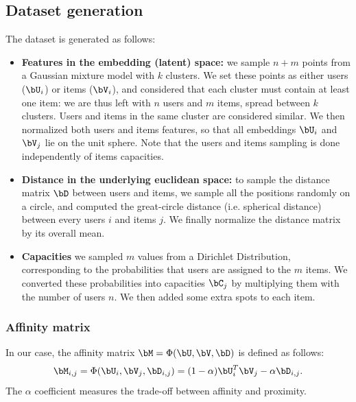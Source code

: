 \subsection*{Dataset generation}
The dataset is generated as follows:
\begin{itemize}
    \item \textbf{Features in the embedding (latent) space:} we sample $n+m$
          points from a Gaussian mixture model with $k$ clusters. We set these points
          as either users ($\bU_i$) or items ($\bV_i$), and considered that each
          cluster must contain at least one item: we are thus left with $n$ users and
          $m$ items, spread between $k$ clusters. Users and items in the same cluster
          are considered similar. We then normalized both users and items features, so
          that all embeddings $\bU_i$ and $\bV_j$ lie on the unit sphere. Note that
          the users and items sampling is done independently of items capacities.

    \item \textbf{Distance in the underlying euclidean space:} to sample the
          distance matrix $\bD$ between users and items, we sample all the positions
          randomly on a circle, and computed the great-circle distance (i.e. spherical
          distance) between every users $i$ and items $j$. We finally normalize the
          distance matrix by its overall mean.

    \item \textbf{Capacities} we sampled $m$ values from a Dirichlet
          Distribution, corresponding to the probabilities that users are assigned to
          the $m$ items. We converted these probabilities into capacities $\bC_j$ by
          multiplying them with the number of users $n$. We then added some extra
          spots to each item.
\end{itemize}

\subsubsection*{Affinity matrix}
In our case, the affinity matrix $\bM=\Phi(\bU,\bV,\bD)$ is defined as follows:
\begin{equation}\label{eq:phi_def_illustration}
    \bM_{i,j}=\Phi(\bU_i,\bV_j,\bD_{i,j}) = (1-\alpha) \bU_i^T \bV_j - \alpha \bD_{i,j}.
\end{equation} The $\alpha$ coefficient measures the trade-off between affinity and proximity.

